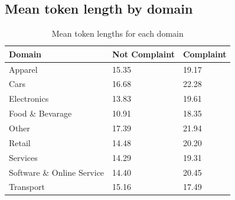 \subsection{Mean token length by domain}
\label{sec: avg_token_length_domains}
\begin{table}[htbp]
    \small
    \centering
    \begin{tabularx}{\textwidth}{|X|X|X|}
        \hline
        \rowcolor[gray]{0.7}
        \textbf{Domain} & \textbf{Not Complaint} & \textbf{Complaint} \\
        \hline
        Apparel & 15.35 & 19.17 \\
        \hline
        Cars & 16.68 & 22.28 \\
        \hline
        Electronics & 13.83 & 19.61 \\
        \hline
        Food \& Bevarage & 10.91 & 18.35 \\
        \hline
        Other & 17.39 & 21.94 \\
        \hline
        Retail & 14.48 & 20.20 \\
        \hline
        Services & 14.29 & 19.31 \\
        \hline
        Software \& Online Service & 14.40 & 20.45 \\
        \hline
        Transport & 15.16 & 17.49 \\
        \hline
    \end{tabularx}
    \caption{Mean token lengths for each domain}
    \label{tab: avg_token_length_domains}    
\end{table}